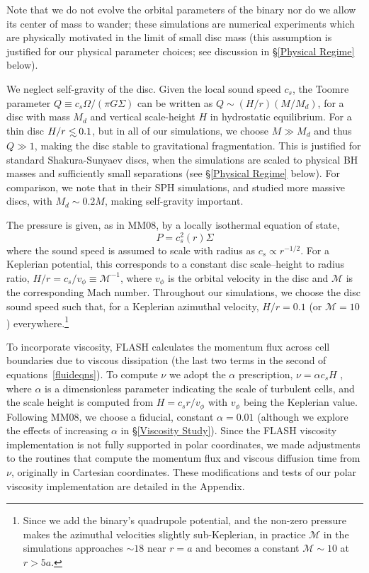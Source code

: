 Note that we do not evolve the orbital parameters of the binary nor do we allow its center of mass to wander; 
these simulations are numerical experiments which are physically motivated in the limit of small disc mass 
(this assumption is justified for our physical parameter choices; see discussion in \S\ref{Physical Regime} below).

We neglect self-gravity of the disc. Given the local sound speed
$c_s$, the Toomre parameter $Q\equiv c_s \Omega /\left( \pi G \Sigma
\right)$ can be written as $Q \sim (H/r)(M/M_d)$, for a disc with mass
$M_d$ and vertical scale-height $H$ in hydrostatic equilibrium. For a
thin disc $H/r \lsim 0.1$, but in all of our simulations, we choose $M
\gg M_d$ and thus $Q \gg 1$, making the disc stable to gravitational
fragmentation. This is justified for standard Shakura-Sunyaev discs,
when the simulations are scaled to physical BH masses and sufficiently
small separations (see \S\ref{Physical Regime} below).  For
comparison, we note that in their SPH simulations, \cite{Cuadra:2009}
and \cite{Roedig:2012:Trqs} studied more massive discs, with $M_d
\sim 0.2 M$, making self-gravity important.

The pressure is given, as in MM08, by a locally isothermal equation of
state,
%
\begin{equation}
P = c_s^2(r) \Sigma
\end{equation}
%
where the sound speed is assumed to scale with radius as $c_s \propto
r^{-1/2}$. For a Keplerian potential, this corresponds to a constant
disc scale--height to radius ratio, $H/r = c_s / v_{\phi} \equiv
\mathcal{M}^{-1}$, where $v_{\phi}$ is the orbital velocity in the
disc and $\mathcal{M}$ is the corresponding Mach number.  Throughout
our simulations, we choose the disc sound speed such that, for a
Keplerian azimuthal velocity, $H/r=0.1$ (or $\mathcal{M}=10$)
everywhere.\footnote{Since we add the binary's quadrupole
  potential, and the non-zero pressure makes the azimuthal velocities
  slightly sub-Keplerian, in practice $\mathcal{M}$ in the simulations
  approaches $\sim 18$ near $r=a$ and becomes a constant
  $\mathcal{M}\sim 10$ at $r>5a$.}

To incorporate viscosity, FLASH calculates the momentum flux across
cell boundaries due to viscous dissipation (the last two terms in the
second of equations~\ref{fluideqns}). To compute $\nu$ we adopt the
$\alpha$ prescription, $\nu=\alpha c_s H$ \citep{SS73}, where $\alpha$
is a dimensionless parameter indicating the scale of turbulent cells,
and the scale height is computed from $H = c_s r / v_{\phi}$ with
$v_{\phi}$ being the Keplerian value.  Following MM08, we choose a fiducial,
constant $\alpha=0.01$ (although we explore the effects of increasing $\alpha$ in \S \ref{Viscosity Study}). 
Since the FLASH viscosity implementation is not fully supported in
polar coordinates, we made adjustments to the routines that compute
the momentum flux and viscous diffusion time from $\nu$, originally in Cartesian coordinates. 
These modifications and tests of our polar viscosity implementation are detailed in the Appendix.


